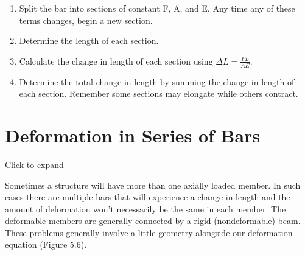 \documentclass[
  letterpaper,
  DIV=11,
  numbers=noendperiod]{scrreprt}
\begin{document}
\begin{tcolorbox}[enhanced jigsaw, colbacktitle=quarto-callout-note-color!10!white, title={Step-by-step: Axial deformation}, coltitle=black, leftrule=.75mm, rightrule=.15mm, opacityback=0, breakable, colframe=quarto-callout-note-color-frame, left=2mm, arc=.35mm, colback=white, bottomrule=.15mm, bottomtitle=1mm, toptitle=1mm, titlerule=0mm, opacitybacktitle=0.6, toprule=.15mm]

\begin{enumerate}
\def\labelenumi{\arabic{enumi}.}
\item
  Split the bar into sections of constant F, A, and E. Any time any of
  these terms changes, begin a new section.
\item
  Determine the length of each section.
\item
  Calculate the change in length of each section using
  \(\Delta L=\frac{F L}{A E}\).
\item
  Determine the total change in length by summing the change in length
  of each section. Remember some sections may elongate while others
  contract.
\end{enumerate}

\end{tcolorbox}

\section{Deformation in Series of
Bars}\label{deformation-in-series-of-bars}

Click to expand

Sometimes a structure will have more than one axially loaded member. In
such cases there are multiple bars that will experience a change in
length and the amount of deformation won't necessarily be the same in
each member. The deformable members are generally connected by a rigid
(nondeformable) beam. These problems generally involve a little geometry
alongside our deformation equation (Figure 5.6).
\end{document}
